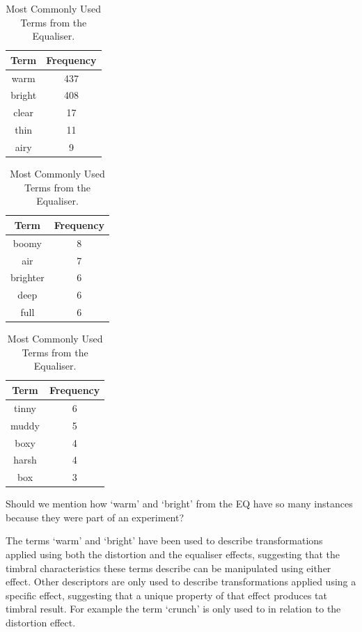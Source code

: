 		\begin{table}[h!]
			\centering
			\begin{tabular}{|c|c|}
				\hline
				\bf{Term} & \bf{Frequency} \\
				\hline
				\hline
				warm & 437 \\
				\hline
				bright & 408 \\
				\hline
				clear & 17 \\
				\hline
				thin & 11 \\
				\hline
				airy & 9 \\
				\hline
			\end{tabular}
			\qquad
			\begin{tabular}{|c|c|}
				\hline
				\bf{Term} & \bf{Frequency} \\
				\hline
				\hline
				boomy & 8 \\
				\hline
				air & 7 \\
				\hline
				brighter & 6 \\
				\hline
				deep & 6 \\
				\hline
				full & 6 \\
				\hline
			\end{tabular}
			\qquad
			\begin{tabular}{|c|c|}
				\hline
				\bf{Term} & \bf{Frequency} \\
				\hline
				\hline
				tinny & 6 \\
				\hline
				muddy & 5 \\
				\hline
				boxy & 4 \\
				\hline
				harsh & 4 \\
				\hline
				box & 3 \\
				\hline
			\end{tabular}
			\caption{Most Commonly Used Terms from the Equaliser.}
			\label{tab:EqualiserTerms}
		\end{table}

		\note
		{
			Should we mention how `warm' and `bright' from the EQ have so many instances because they were part
			of an experiment?
		}

		The terms `warm' and `bright' have been used to describe transformations applied using both the distortion
		and the equaliser effects, suggesting that the timbral characteristics these terms describe can be
		manipulated using either effect. Other descriptors are only used to describe transformations applied using a
		specific effect, suggesting that a unique property of that effect produces tat timbral result. For example
		the term `crunch' is only used to in relation to the distortion effect.

